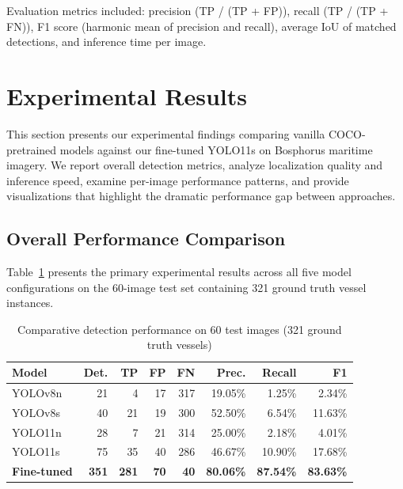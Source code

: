 \documentclass[pdflatex,sn-mathphys-num,Numbered]{sn-jnl}
\begin{document}
Evaluation metrics included: precision (TP / (TP + FP)), recall (TP / (TP + FN)), F1 score (harmonic mean of precision and recall), average IoU of matched detections, and inference time per image.

\section{Experimental Results}\label{sec:results}

This section presents our experimental findings comparing vanilla COCO-pretrained models against our fine-tuned YOLO11s on Bosphorus maritime imagery. We report overall detection metrics, analyze localization quality and inference speed, examine per-image performance patterns, and provide visualizations that highlight the dramatic performance gap between approaches.

\subsection{Overall Performance Comparison}\label{subsec:overall-performance}

Table~\ref{tab:results} presents the primary experimental results across all five model configurations on the 60-image test set containing 321 ground truth vessel instances.

\begin{table}[!ht]
\centering
\caption{Comparative detection performance on 60 test images (321 ground truth vessels)}\label{tab:results}
\begin{tabular}{lrrrrrrr}
\toprule
\textbf{Model} & \textbf{Det.} & \textbf{TP} & \textbf{FP} & \textbf{FN} & \textbf{Prec.} & \textbf{Recall} & \textbf{F1} \\
\midrule
YOLOv8n & 21 & 4 & 17 & 317 & 19.05\% & 1.25\% & 2.34\% \\
YOLOv8s & 40 & 21 & 19 & 300 & 52.50\% & 6.54\% & 11.63\% \\
YOLO11n & 28 & 7 & 21 & 314 & 25.00\% & 2.18\% & 4.01\% \\
YOLO11s & 75 & 35 & 40 & 286 & 46.67\% & 10.90\% & 17.68\% \\
\textbf{Fine-tuned} & \textbf{351} & \textbf{281} & \textbf{70} & \textbf{40} & \textbf{80.06\%} & \textbf{87.54\%} & \textbf{83.63\%} \\
\bottomrule
\end{tabular}
\end{table}
\end{document}
